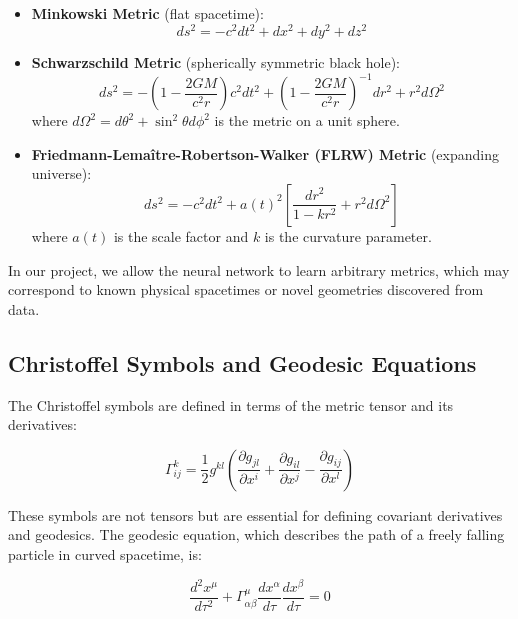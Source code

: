 \documentclass[11pt,a4paper]{article}
\newcommand{\pd}[2]{\frac{\partial #1}{\partial #2}}
\newcommand{\christoffel}[3]{\Gamma^{#1}_{#2 #3}}
\begin{document}
\begin{itemize}
    \item \textbf{Minkowski Metric} (flat spacetime):
    \begin{equation}
        ds^2 = -c^2 dt^2 + dx^2 + dy^2 + dz^2
    \end{equation}
    
    \item \textbf{Schwarzschild Metric} (spherically symmetric black hole):
    \begin{equation}
        ds^2 = -\left(1-\frac{2GM}{c^2r}\right)c^2 dt^2 + \left(1-\frac{2GM}{c^2r}\right)^{-1} dr^2 + r^2 d\Omega^2
    \end{equation}
    where $d\Omega^2 = d\theta^2 + \sin^2\theta d\phi^2$ is the metric on a unit sphere.
    
    \item \textbf{Friedmann-Lemaître-Robertson-Walker (FLRW) Metric} (expanding universe):
    \begin{equation}
        ds^2 = -c^2 dt^2 + a(t)^2 \left[\frac{dr^2}{1-kr^2} + r^2 d\Omega^2\right]
    \end{equation}
    where $a(t)$ is the scale factor and $k$ is the curvature parameter.
\end{itemize}

In our project, we allow the neural network to learn arbitrary metrics, which may correspond to known physical spacetimes or novel geometries discovered from data.

\subsection{Christoffel Symbols and Geodesic Equations}

The Christoffel symbols are defined in terms of the metric tensor and its derivatives:

\begin{equation}
    \christoffel{k}{i}{j} = \frac{1}{2} g^{kl} \left( \pd{g_{jl}}{x^i} + \pd{g_{il}}{x^j} - \pd{g_{ij}}{x^l} \right)
\end{equation}

These symbols are not tensors but are essential for defining covariant derivatives and geodesics. The geodesic equation, which describes the path of a freely falling particle in curved spacetime, is:

\begin{equation}
    \frac{d^2 x^\mu}{d\tau^2} + \christoffel{\mu}{\alpha}{\beta} \frac{dx^\alpha}{d\tau} \frac{dx^\beta}{d\tau} = 0
\end{equation}
\end{document}
